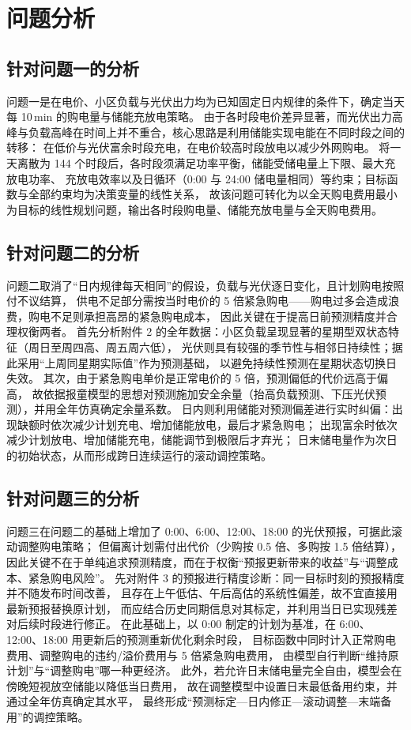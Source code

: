 \section{问题分析}

\subsection{针对问题一的分析}
问题一是在电价、小区负载与光伏出力均为已知固定日内规律的条件下，确定当天每 10\,min 的购电量与储能充放电策略。
由于各时段电价差异显著，而光伏出力高峰与负载高峰在时间上并不重合，核心思路是利用储能实现电能在不同时段之间的转移：
在低价与光伏富余时段充电，在电价较高时段放电以减少外网购电。
将一天离散为 144 个时段后，各时段须满足功率平衡，储能受储电量上下限、最大充放电功率、
充放电效率以及日循环（0:00 与 24:00 储电量相同）等约束；目标函数与全部约束均为决策变量的线性关系，
故该问题可转化为以全天购电费用最小为目标的线性规划问题，输出各时段购电量、储能充放电量与全天购电费用。

\subsection{针对问题二的分析}
问题二取消了“日内规律每天相同”的假设，负载与光伏逐日变化，且计划购电按照付不议结算，
供电不足部分需按当时电价的 5 倍紧急购电——购电过多会造成浪费，购电不足则承担高昂的紧急购电成本，
因此关键在于提高日前预测精度并合理权衡两者。
首先分析附件 2 的全年数据：小区负载呈现显著的星期型双状态特征（周日至周四高、周五周六低），
光伏则具有较强的季节性与相邻日持续性；据此采用“上周同星期实际值”作为预测基础\cite{fpp3}，
以避免持续性预测在星期状态切换日失效。
其次，由于紧急购电单价是正常电价的 5 倍，预测偏低的代价远高于偏高，
故依据报童模型的思想对预测施加安全余量（抬高负载预测、下压光伏预测）\cite{arrow1951}，并用全年仿真确定余量系数。
日内则利用储能对预测偏差进行实时纠偏：出现缺额时依次减少计划充电、增加储能放电，最后才紧急购电；
出现富余时依次减少计划放电、增加储能充电，储能调节到极限后才弃光；
日末储电量作为次日的初始状态，从而形成跨日连续运行的滚动调控策略。

\subsection{针对问题三的分析}
问题三在问题二的基础上增加了 0:00、6:00、12:00、18:00 的光伏预报，可据此滚动调整购电策略；
但偏离计划需付出代价（少购按 0.5 倍、多购按 1.5 倍结算），
因此关键不在于单纯追求预测精度，而在于权衡“预报更新带来的收益”与“调整成本、紧急购电风险”。
先对附件 3 的预报进行精度诊断：同一目标时刻的预报精度并不随发布时间改善，
且存在上午低估、午后高估的系统性偏差，故不宜直接用最新预报替换原计划，
而应结合历史同期信息对其标定，并利用当日已实现残差对后续时段进行修正。
在此基础上，以 0:00 制定的计划为基准，在 6:00、12:00、18:00 用更新后的预测重新优化剩余时段，
目标函数中同时计入正常购电费用、调整购电的违约/溢价费用与 5 倍紧急购电费用，
由模型自行判断“维持原计划”与“调整购电”哪一种更经济。
此外，若允许日末储电量完全自由，模型会在傍晚短视放空储能以降低当日费用，
故在调整模型中设置日末最低备用约束，并通过全年仿真确定其水平，
最终形成“预测标定—日内修正—滚动调整—末端备用”的调控策略。

